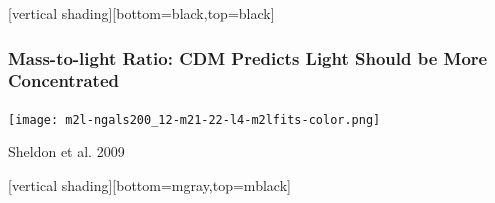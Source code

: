 \documentclass{beamer}
\begin{document}

{
    [vertical shading][bottom=black,top=black]


    \frame
    {
        \frametitle{Mass-to-light Ratio: CDM Predicts Light Should be More Concentrated}

        \begin{center}
            \texttt{[image: m2l-ngals200\_12-m21-22-l4-m2lfits-color.png]}
        \end{center}
        \hfill {\color{gold} Sheldon et al. 2009}
    }
    [vertical shading][bottom=mgray,top=mblack]
}
\end{document}
